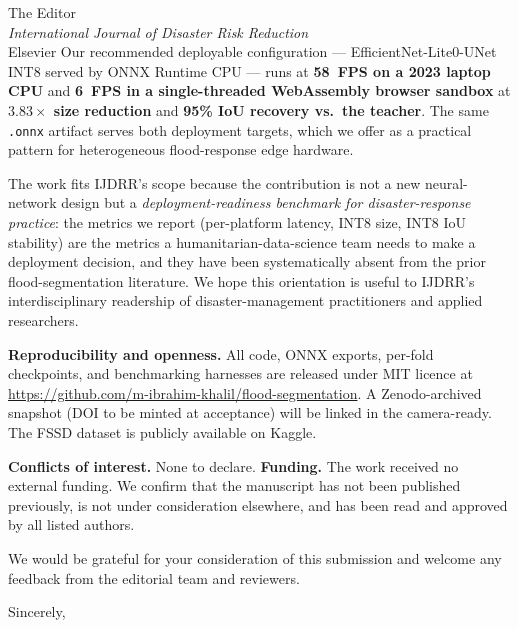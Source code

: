 \documentclass[11pt]{letter}
\begin{document}
\begin{letter}{The Editor\\\emph{International Journal of Disaster Risk Reduction}\\Elsevier}
Our recommended deployable configuration --- EfficientNet-Lite0-UNet INT8 served by ONNX Runtime CPU --- runs at \textbf{58~FPS on a 2023 laptop CPU} and \textbf{6~FPS in a single-threaded WebAssembly browser sandbox} at \textbf{$3.83\times$ size reduction} and \textbf{95\% IoU recovery vs.~the teacher}. The same \texttt{.onnx} artifact serves both deployment targets, which we offer as a practical pattern for heterogeneous flood-response edge hardware.

The work fits IJDRR's scope because the contribution is not a new neural-network design but a \emph{deployment-readiness benchmark for disaster-response practice}: the metrics we report (per-platform latency, INT8 size, INT8 IoU stability) are the metrics a humanitarian-data-science team needs to make a deployment decision, and they have been systematically absent from the prior flood-segmentation literature. We hope this orientation is useful to IJDRR's interdisciplinary readership of disaster-management practitioners and applied researchers.

\textbf{Reproducibility and openness.} All code, ONNX exports, per-fold checkpoints, and benchmarking harnesses are released under MIT licence at \url{https://github.com/m-ibrahim-khalil/flood-segmentation}. A Zenodo-archived snapshot (DOI to be minted at acceptance) will be linked in the camera-ready. The FSSD dataset is publicly available on Kaggle.

\textbf{Conflicts of interest.} None to declare. \textbf{Funding.} The work received no external funding. We confirm that the manuscript has not been published previously, is not under consideration elsewhere, and has been read and approved by all listed authors.

We would be grateful for your consideration of this submission and welcome any feedback from the editorial team and reviewers.

\closing{Sincerely,}

\end{letter}
\end{document}
